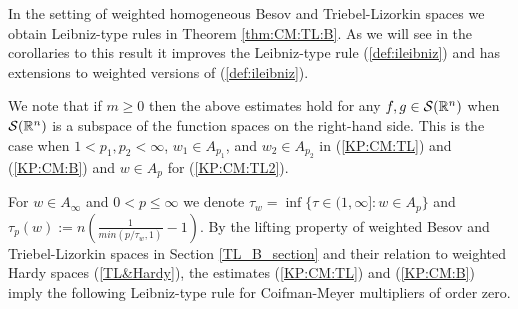  In the setting of weighted homogeneous Besov and Triebel-Lizorkin spaces we obtain Leibniz-type rules in Theorem \ref{thm:CM:TL:B}. As we will see in the corollaries to this result it improves the Leibniz-type rule (\ref{def:ileibniz}) and has extensions to weighted versions of (\ref{def:ileibniz}).
  
%

We note that if $m\geq 0$ then the above estimates hold for any $f,g\in{\mathcal{S}}({{\mathbb R}^n})$ when ${\mathcal{S}}({{\mathbb R}^n})$ is a subspace of the function spaces on the right-hand side. This is the case when $1<p_1,p_2<\infty$, $w_1\in A_{p_1}$, and $w_2\in A_{p_2}$ in (\ref{KP:CM:TL}) and (\ref{KP:CM:B}) and $w\in A_p$ for (\ref{KP:CM:TL2}). 

For $w \in A_\infty$ and $0<p\leq\infty$ we denote 
$\tau_w = \inf\{\tau\in(1,\infty]: w\in A_p\}$ and 
 $\tau_p(w) := n\left( \frac{1}{min(p/\tau_w,1)} - 1 \right).$  By the lifting property of weighted Besov and Triebel-Lizorkin spaces in Section \ref{TL_B_section} and their relation to weighted Hardy spaces (\ref{TL&Hardy}), the estimates (\ref{KP:CM:TL}) and (\ref{KP:CM:B}) imply the following Leibniz-type rule for Coifman-Meyer multipliers of order zero.

